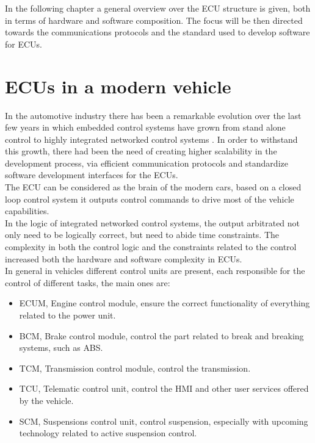 \documentclass[../main.tex]{subfiles}
\begin{document}
In the following chapter a general overview over the ECU structure is given, both in terms of hardware and software composition. The focus will be then directed towards the communications protocols and the standard used to develop software for \gls{ECU}s. 
\section{ECUs in a modern vehicle}
In the automotive industry there has been a remarkable evolution over the last few years in which embedded control systems have grown from stand alone control to highly integrated networked control systems \cite{Johansson_vehicleapplications}. In order to withstand this growth, there had been the need of creating higher scalability in the development process, via efficient communication protocols and standardize software development interfaces for the \gls{ECU}s.\\
The \gls{ECU} can be considered as the brain of the modern cars, based on a closed loop control system it outputs control commands to drive most of the vehicle capabilities.\\
In the logic of integrated networked control systems, the output arbitrated not only need to be logically correct, but need to abide time constraints. The complexity in both the control logic and the constraints related to the control increased both the hardware and software complexity in \gls{ECU}s.\\
In general in vehicles different control units are present, each responsible for the control of different tasks, the main ones are:
\begin{itemize}
    \item \gls{ECUM}, Engine control module, ensure the correct functionality of everything related to the power unit.
    \item \gls{BCM}, Brake control module, control the part related to break and breaking systems, such as \gls{ABS}.
    \item \gls{TCM}, Transmission control module, control the transmission.
    \item \gls{TCU}, Telematic control unit, control the \gls{HMI} and other user services offered by the vehicle. 
    \item \gls{SCM}, Suspensions control unit, control suspension, especially with upcoming technology related to active suspension control. 
\end{itemize}
\end{document}
